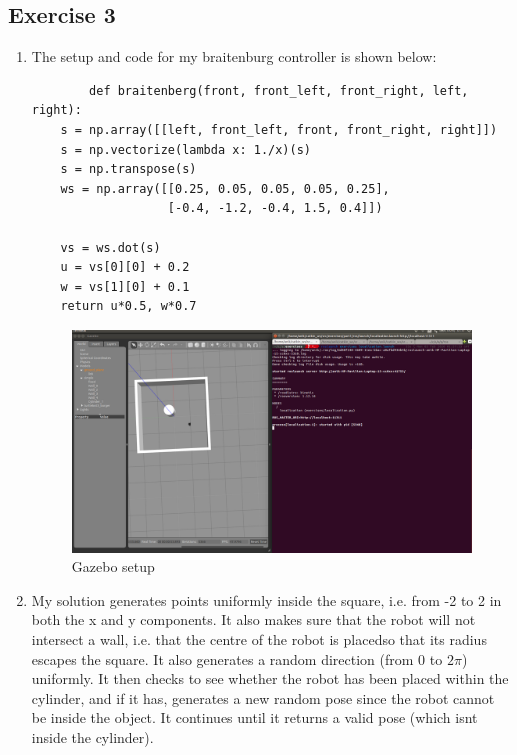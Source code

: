 \documentclass[12pt,a4paper]{article}
\begin{document}
\subsection*{Exercise 3}
\begin{enumerate}[label=(\alph*)]
	\item The setup and code for my braitenburg controller is shown below:\\
	\begin{verbatim}
		def braitenberg(front, front_left, front_right, left, right):
    s = np.array([[left, front_left, front, front_right, right]])
    s = np.vectorize(lambda x: 1./x)(s)
    s = np.transpose(s)
    ws = np.array([[0.25, 0.05, 0.05, 0.05, 0.25],
                   [-0.4, -1.2, -0.4, 1.5, 0.4]])

    vs = ws.dot(s)
    u = vs[0][0] + 0.2
    w = vs[1][0] + 0.1
    return u*0.5, w*0.7

	\end{verbatim}
	\begin{figure}[h]
		\centering
		\includegraphics[width=\textwidth]{fig/3a.png}
		\caption{Gazebo setup}
		\label{fig:gazebo}
	\end{figure}

	\item My solution generates points uniformly inside the square, i.e. from -2 to 2 in both the x and y components. It also makes sure that the robot will not intersect a wall, i.e. that the centre of the robot is placedso that its radius escapes the square. It also generates a random direction (from 0 to $2\pi$) uniformly. It then checks to see whether the robot has been placed within the cylinder, and if it has, generates a new random pose since the robot cannot be inside the object. It continues until it returns a valid pose (which isnt inside the cylinder). 
	

\end{enumerate}
\end{document}
